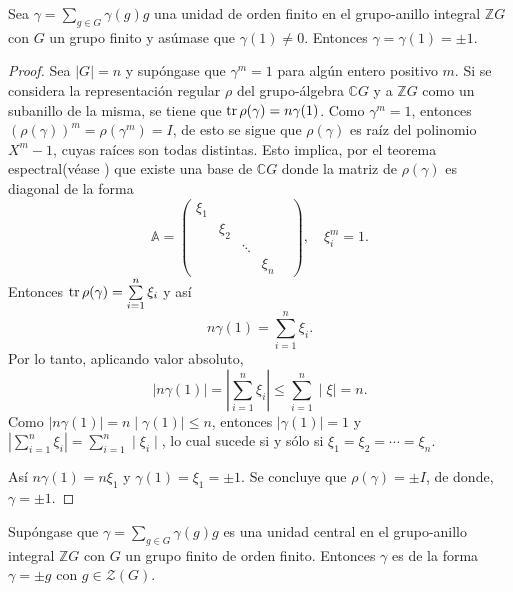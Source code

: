 \begin{lema}\label{lem:BH}
Sea $\gamma = \sum_{g \in G}\gamma(g)g$ una unidad de orden finito en el grupo-anillo integral $\mathds{Z}G$ con $G$ un grupo finito y asúmase que $\gamma(1)\neq 0$. Entonces $\gamma = \gamma(1) = \pm 1.$
\end{lema}
\begin{proof}
Sea $|G| = n$ y supóngase que $\gamma^{m} = 1$ para algún entero positivo $m$. Si se considera la representación regular $\rho$ del grupo-álgebra $\mathds{C}G$ y a $\mathds{Z}G$ como un subanillo de la misma, se tiene que $\operatorname{tr}\rho(\gamma) = n\gamma(1)$.
Como $\gamma^{m} = 1$, entonces $\left( \rho(\gamma) \right)^m = \rho(\gamma^{m}) = I$, de esto se sigue que $\rho(\gamma)$ es raíz del polinomio $X^m-1$, cuyas raíces son todas distintas. Esto implica, por el teorema espectral(véase \cite[p 214]{bib:lang}) que existe una base de $\mathds{C}G$ donde la matriz de $\rho(\gamma)$ es diagonal de la forma
\begin{equation*}
\mathds{A} = \begin{pmatrix}
\xi_1 & & & &\\
 & \xi_2 & & \\
 & & \ddots & \\
  & & & \xi_n
\end{pmatrix}, \quad \xi_i^m = 1.
\end{equation*}
 Entonces $\operatorname{tr}\rho(\gamma) = \sum\limits_{i = 1}^{n}\xi_i$ y así
 \begin{equation*}
 n\gamma(1) = \sum\limits_{i =1}^{n}\xi_i.
 \end{equation*}
 Por lo tanto, aplicando valor absoluto,
 \begin{equation*}
 \mid n\gamma(1) \mid = \left| \sum_{i = 1}^{n}\xi_i \right| \leq \sum_{i = 1}^{n}\mid \xi \mid = n.
 \end{equation*}
 Como $\mid n\gamma(1)\mid = n\mid\gamma(1)\mid \leq n$, entonces $\mid \gamma(1) \mid = 1$ y $\left| \sum_{i = 1}^{n}\xi_i \right| = \sum\limits_{i = 1}^{n}\mid \xi_i \mid$, lo cual sucede si y sólo si $\xi_1=\xi_2=\cdots = \xi_n$.
 
 Así $n\gamma(1) = n\xi_1$ y $\gamma(1) = \xi_1=\pm 1$. Se concluye que $\rho(\gamma) = \pm I$, de donde, $\gamma = \pm 1$.
\end{proof}
\begin{corolario}
Supóngase que $\gamma = \sum_{g \in G}\gamma(g)g$ es una unidad central en el grupo-anillo integral $\mathds{Z}G$ con $G$ un grupo finito de orden finito. Entonces $\gamma$ es de la forma $\gamma = \pm g$ con $g \in  \mathcal{Z}(G)$.
\end{corolario}
